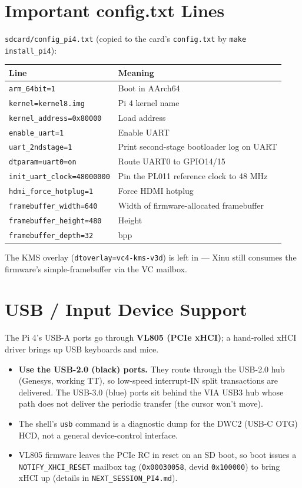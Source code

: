 \documentclass[a4paper,11pt]{article}
\begin{document}
\section{Important config.txt Lines}
\verb|sdcard/config_pi4.txt| (copied to the card's \verb|config.txt| by
\verb|make install_pi4|):
\begin{center}\footnotesize
\begin{tabular}{@{}l p{7.6cm}@{}}
\toprule
\textbf{Line} & \textbf{Meaning}\\
\midrule
\verb|arm_64bit=1|              & Boot in AArch64\\
\verb|kernel=kernel8.img|       & Pi 4 kernel name\\
\verb|kernel_address=0x80000|   & Load address\\
\verb|enable_uart=1|            & Enable UART\\
\verb|uart_2ndstage=1|          & Print second-stage bootloader log on UART\\
\verb|dtparam=uart0=on|         & Route UART0 to GPIO14/15\\
\verb|init_uart_clock=48000000| & Pin the PL011 reference clock to 48 MHz\\
\verb|hdmi_force_hotplug=1|     & Force HDMI hotplug\\
\verb|framebuffer_width=640|    & Width of firmware-allocated framebuffer\\
\verb|framebuffer_height=480|   & Height\\
\verb|framebuffer_depth=32|     & bpp\\
\bottomrule
\end{tabular}
\end{center}
The KMS overlay (\verb|dtoverlay=vc4-kms-v3d|) is left in --- Xinu still
consumes the firmware's simple-framebuffer via the VC mailbox.

\section{USB / Input Device Support}
The Pi 4's USB-A ports go through \textbf{VL805 (PCIe xHCI)}; a hand-rolled
xHCI driver brings up USB keyboards and mice.
\begin{itemize}[leftmargin=1.4em,itemsep=1pt]
\item \textbf{Use the USB-2.0 (black) ports.} They route through the USB-2.0 hub
  (Genesys, working TT), so low-speed interrupt-IN split transactions are
  delivered. The USB-3.0 (blue) ports sit behind the VIA USB3 hub whose path
  does not deliver the periodic transfer (the cursor won't move).
\item The shell's \verb|usb| command is a diagnostic dump for the DWC2 (USB-C
  OTG) HCD, not a general device-control interface.
\item VL805 firmware leaves the PCIe RC in reset on an SD boot, so boot issues a
  \verb|NOTIFY_XHCI_RESET| mailbox tag (\verb|0x00030058|, devid \verb|0x100000|)
  to bring xHCI up (details in \verb|NEXT_SESSION_PI4.md|).
\end{itemize}
\end{document}
